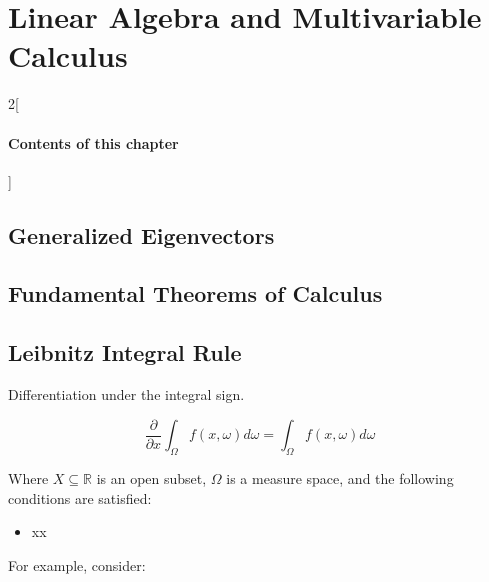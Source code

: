 \chapter{Linear Algebra and Multivariable Calculus}

\begin{multicols}{2}[\subsubsection*{Contents of this chapter}]
\end{multicols}








\section{Generalized Eigenvectors}










\section{Fundamental Theorems of Calculus}
\section{Leibnitz Integral Rule}
Differentiation under the integral sign. 

\begin{equation}
\frac{\partial}{\partial x }\int_{\Omega} f(x,\omega)d\omega = \int_{\Omega}f(x,\omega)d\omega
\end{equation}

Where $X\subseteq\mathbb{R}$ is an open subset, $\Omega$ is a measure space, and the following conditions are satisfied:

\begin{itemize} 
\item xx
\end{itemize}
For example, consider:

\chapauthor{}
